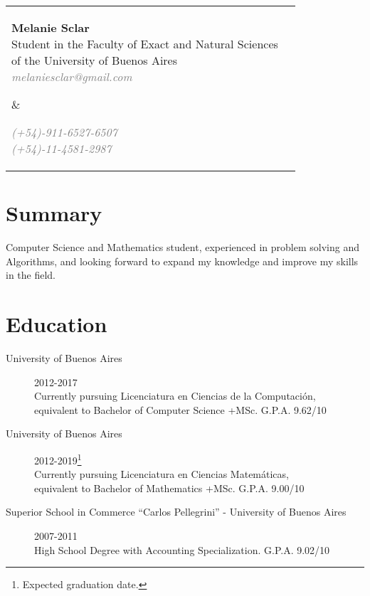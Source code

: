 \documentclass [a4paper, 11pt]{article}
\begin{document}
\noindent \begin{tabularx}{\textwidth}{X r}
  \hspace{-15pt}\parbox[t]{15cm}{
  \hspace{-2pt}\textbf{\huge{Melanie Sclar}} \\
  Student in the Faculty of Exact and Natural Sciences \\
  of the University of Buenos Aires \\
  \emph{ \textcolor{gray}{melaniesclar@gmail.com} }
  } &

\parbox[t]{3.8cm}{ \emph{\textcolor{gray}{
  (+54)-911-6527-6507 \\
  (+54)-11-4581-2987 }}
  
}
\end{tabularx}

\sectionfont{\sectionrule{0pt}{0pt}{-.2cm}{1pt}}
\section* {Summary}
Computer Science and Mathematics student, experienced in problem solving and Algorithms, and looking forward to expand my knowledge and improve my skills in the field.
\section* {Education}

\begin{description}
  \item[University of Buenos Aires]{\hfill 2012-2017 \\
	Currently pursuing Licenciatura en Ciencias de la Computaci\'on, \\
	equivalent to Bachelor of Computer Science +MSc. G.P.A. 9.62/10}

  \item[University of Buenos Aires]{\hfill 2012-2019\footnote{Expected graduation date.} \\
	Currently pursuing Licenciatura en Ciencias Matem\'aticas, \\
	equivalent to Bachelor of Mathematics +MSc. G.P.A. 9.00/10}
	
  \item[Superior School in Commerce ``Carlos Pellegrini'' - University of Buenos Aires] {\hfill 2007-2011 \\
	High School Degree with Accounting Specialization. G.P.A. 9.02/10}
\end{description}
\end{document}
